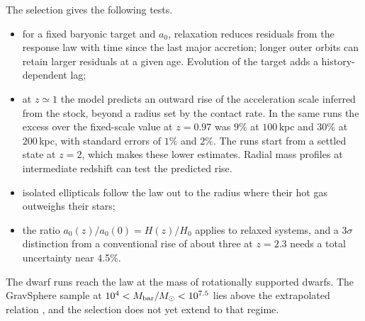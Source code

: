 The selection gives the following tests.
\begin{itemize}
\item for a fixed baryonic target and $a_0$, relaxation reduces residuals
from the response law with time since the last major accretion; longer
outer orbits can retain larger residuals at a given age. Evolution of the
target adds a history-dependent lag;
\item at $z\simeq1$ the model predicts an outward rise of the acceleration
scale inferred from the stock, beyond a radius set by the contact rate. In
the same runs the excess over the fixed-scale value at $z=0.97$ was $9\%$
at $100\,$kpc and $30\%$ at $200\,$kpc, with standard errors of $1\%$ and
$2\%$. The runs start from a settled state at $z=2$, which makes these
lower estimates. Radial mass profiles at intermediate redshift can test
the predicted rise. 
\item isolated ellipticals follow the law out to the radius where their hot
gas outweighs their stars;
\item the ratio $a_0(z)/a_0(0)=H(z)/H_0$ applies to relaxed systems, and a
$3\sigma$ distinction from a conventional rise of about three at $z=2.3$
\cite{mayer22} needs a total uncertainty near 4.5\%.
\end{itemize}
The dwarf runs reach the law at the mass of rotationally supported dwarfs.
The GravSphere sample at $10^4<M_{\rm bar}/M_\odot<10^{7.5}$ lies above the
extrapolated relation \cite{julio25}, and the selection does not yet
extend to that regime.

